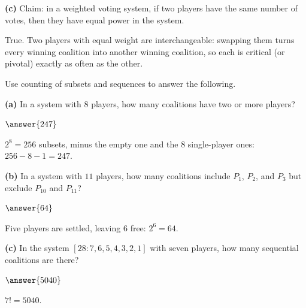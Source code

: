 \documentclass[12pt]{ximera}
\begin{document}
\begin{problem}
\begin{prompt}
\textbf{(c)} Claim: in a weighted voting system, if two players have the same number of
votes, then they have equal power in the system.

\begin{multipleChoice}
\end{multipleChoice}

\begin{feedback}
True. Two players with equal weight are interchangeable: swapping them turns every
winning coalition into another winning coalition, so each is critical (or pivotal)
exactly as often as the other.
\end{feedback}
\end{prompt}
\end{problem}

\begin{problem}
Use counting of subsets and sequences to answer the following.

\begin{prompt}
\textbf{(a)} In a system with $8$ players, how many coalitions have two or more
players?

$\answer{247}$

\begin{feedback}
$2^8=256$ subsets, minus the empty one and the $8$ single-player ones:
$256-8-1=247$.
\end{feedback}
\end{prompt}

\begin{prompt}
\textbf{(b)} In a system with $11$ players, how many coalitions include $P_1$, $P_2$,
and $P_3$ but exclude $P_{10}$ and $P_{11}$?

$\answer{64}$

\begin{feedback}
Five players are settled, leaving $6$ free: $2^6=64$.
\end{feedback}
\end{prompt}

\begin{prompt}
\textbf{(c)} In the system $[28:7,6,5,4,3,2,1]$ with seven players, how many
sequential coalitions are there?

$\answer{5040}$

\begin{feedback}
$7!=5040$.
\end{feedback}
\end{prompt}
\end{problem}
\end{document}
